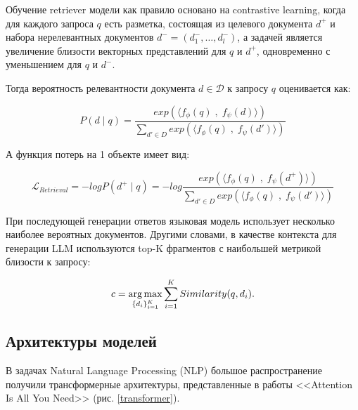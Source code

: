 Обучение retriever модели как правило основано на contrastive learning, когда для каждого запроса $q$ есть разметка, состоящая из целевого документа $d^{+}$ и набора нерелевантных документов $d^{-} = (d_1^{-}, \ldots, d_l^{-})$, а задачей является увеличение близости векторных представлений для $q$ и $d^{+}$, одновременно с уменьшением для $q$ и $d^{-}$.

Тогда вероятность релевантности документа $d \in \mathcal D$ к запросу $q$ оценивается как: 

\begin{equation}
    P(d \mid q) = \frac{exp(\langle f_{\phi}(q) \; , \; f_{\psi}(d) \rangle)}{\sum_{d' \in D}exp(\langle f_{\phi}(q) \; , \; f_{\psi}(d') \rangle)}
\end{equation}

А функция потерь на 1 объекте имеет вид:

\begin{equation}
    \mathcal{L}_{Retrieval} = -log P(d^{+} \mid q) = - log \frac{exp(\langle f_{\phi}(q) \; , \; f_{\psi}(d^{+}) \rangle)}{\sum_{d' \in D}exp(\langle f_{\phi}(q) \; , \; f_{\psi}(d') \rangle)}
    \label{retrieval_loss}
\end{equation}

При последующей генерации ответов языковая модель использует несколько наиболее вероятных документов. Другими словами, в качестве контекста для генерации LLM используются top-K фрагментов с наибольшей метрикой близости к запросу:

\begin{equation}
   c = \operatorname*{arg\,max}_{\{{d_i}\}_{i=1}^K} \sum_{i=1}^K Similarity(q, d_i).
\end{equation}

\subsection{Архитектуры моделей}
\label{subsec:language_model} 



В задачах Natural Language Processing (NLP) большое распространение получили трансформерные архитектуры, представленные в работы <<Attention Is All You Need>> \cite{transformer} (рис. \ref{transformer}).

